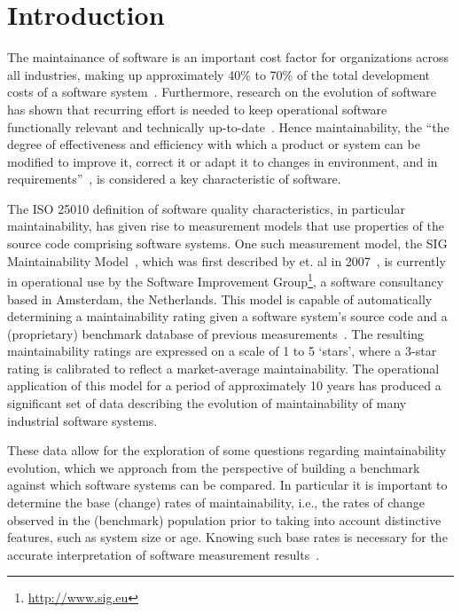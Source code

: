 \section{Introduction}
The maintainance of software is an important cost factor for organizations across all industries, making up approximately 40\% to 70\% of the total development costs of a software system~\cite{grubb2003software}.
Furthermore, research on the evolution of software has shown that recurring effort is needed to keep operational software functionally relevant and technically up-to-date~\cite{lehman1980programs}.  
Hence maintainability, the ``the degree of effectiveness and efficiency with which a product or system can be modified to improve it, correct it or adapt it to changes in environment, and in requirements''~\cite{iso25010}, is considered a key characteristic of software.

The {ISO 25010} definition of software quality characteristics, in particular maintainability, has given rise to measurement models that use properties of the source code comprising software systems.
One such measurement model, the SIG Maintainability Model~\cite{sig-maintainability-model}, which was first described by  et. al in 2007~\cite{heitlager2007practical}, is currently in operational use by the Software Improvement Group\footnote{\url{http://www.sig.eu}}, a software consultancy based in Amsterdam, the Netherlands.
This model is capable of automatically determining a maintainability rating given a software system's source code and a (proprietary) benchmark database of previous measurements~\cite{alves2010deriving}.
The resulting maintainability ratings are expressed on a scale of 1 to 5 `stars', where a 3-star rating is calibrated to reflect a market-average maintainability.
The operational application of this model for a period of approximately 10 years has produced a significant set of data describing the evolution of maintainability of many industrial software systems.

These data allow for the exploration of some questions regarding maintainability evolution, which we approach from the perspective of building a benchmark against which software systems can be compared.
In particular it is important to determine the base (change) rates of maintainability, i.e., the rates of change observed in the (benchmark) population prior to taking into account distinctive features, such as system size or age.
Knowing such base rates is necessary for the accurate interpretation of software measurement results~\cite{bruntink2015towards}.

